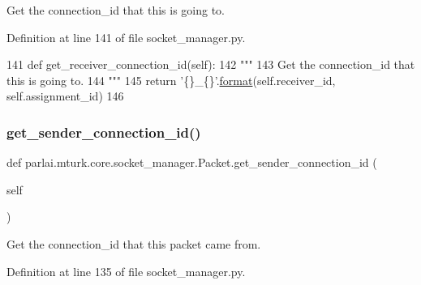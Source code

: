 \begin{DoxyVerb}Get the connection_id that this is going to.
\end{DoxyVerb}
 

Definition at line 141 of file socket\+\_\+manager.\+py.


\begin{DoxyCode}
141     \textcolor{keyword}{def }get\_receiver\_connection\_id(self):
142         \textcolor{stringliteral}{"""}
143 \textcolor{stringliteral}{        Get the connection\_id that this is going to.}
144 \textcolor{stringliteral}{        """}
145         \textcolor{keywordflow}{return} \textcolor{stringliteral}{'\{\}\_\{\}'}.\hyperlink{namespaceparlai_1_1chat__service_1_1services_1_1messenger_1_1shared__utils_a32e2e2022b824fbaf80c747160b52a76}{format}(self.receiver\_id, self.assignment\_id)
146 
\end{DoxyCode}
\mbox{\label{classparlai_1_1mturk_1_1core_1_1socket__manager_1_1Packet_ad472844f177969be64004bc0fd7031d9}} 
\subsubsection{\texorpdfstring{get\+\_\+sender\+\_\+connection\+\_\+id()}{get\_sender\_connection\_id()}}
{\footnotesize\ttfamily def parlai.\+mturk.\+core.\+socket\+\_\+manager.\+Packet.\+get\+\_\+sender\+\_\+connection\+\_\+id (\begin{DoxyParamCaption}\item[{}]{self }\end{DoxyParamCaption})}

\begin{DoxyVerb}Get the connection_id that this packet came from.
\end{DoxyVerb}
 

Definition at line 135 of file socket\+\_\+manager.\+py.


